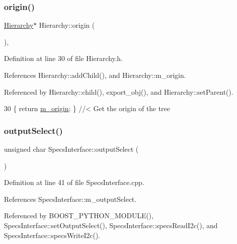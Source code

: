 \subsubsection{\texorpdfstring{origin()}{origin()}}
{\footnotesize\ttfamily \hyperlink{classHierarchy}{Hierarchy}$\ast$ Hierarchy\+::origin (\begin{DoxyParamCaption}{ }\end{DoxyParamCaption})\hspace{0.3cm}{\ttfamily [inline]}, {\ttfamily [inherited]}}



Definition at line 30 of file Hierarchy.\+h.



References Hierarchy\+::add\+Child(), and Hierarchy\+::m\+\_\+origin.



Referenced by Hierarchy\+::child(), export\+\_\+obj(), and Hierarchy\+::set\+Parent().


\begin{DoxyCode}
30 \{ \textcolor{keywordflow}{return} \hyperlink{classHierarchy_a16c73e557d3a7c156ffb5dc4102d148e}{m\_origin}; \}  \textcolor{comment}{//< Get the origin of the tree}
\end{DoxyCode}
\mbox{\label{classSpecsInterface_ab291ed03f4c2f0143e14c26ad5f648dd}} 
\subsubsection{\texorpdfstring{output\+Select()}{outputSelect()}}
{\footnotesize\ttfamily unsigned char Specs\+Interface\+::output\+Select (\begin{DoxyParamCaption}{ }\end{DoxyParamCaption})\hspace{0.3cm}{\ttfamily [inherited]}}



Definition at line 41 of file Specs\+Interface.\+cpp.



References Specs\+Interface\+::m\+\_\+output\+Select.



Referenced by B\+O\+O\+S\+T\+\_\+\+P\+Y\+T\+H\+O\+N\+\_\+\+M\+O\+D\+U\+L\+E(), Specs\+Interface\+::set\+Output\+Select(), Specs\+Interface\+::specs\+Read\+I2c(), and Specs\+Interface\+::specs\+Write\+I2c().


